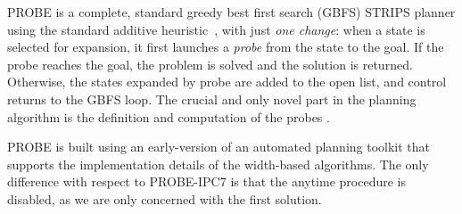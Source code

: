 PROBE is a complete, standard greedy best first search (GBFS) STRIPS
planner using the standard {additive heuristic}~\cite{bonet:aij-hsp},
with just \emph{one change}: when a state is selected for expansion,
it first launches a \emph{probe} from the state to the goal. If the
probe reaches the goal, the problem is solved and the solution is
returned. Otherwise, the states expanded by probe are added to the
open list, and control returns to the GBFS loop. The crucial
  and only novel part in the planning algorithm is the definition and
  computation of the probes \cite{nir:icaps11}.

PROBE is built using an early-version of an automated planning toolkit
that supports the implementation details of the width-based
algorithms. The only difference with respect to PROBE-IPC7 is that the
anytime procedure is disabled, as we are only concerned with the first
solution.

